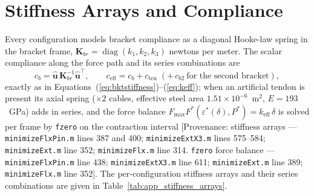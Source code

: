 \section{Stiffness Arrays and Compliance}

Every configuration models bracket compliance as a diagonal Hooke-law spring in the bracket frame, $\mathbf{K}_{br} = \operatorname{diag}(k_{1}, k_{2}, k_{3})$ newtons per meter. The scalar compliance along the force path and its series combinations are
\begin{equation}
    c_{b} = \hat{\mathbf{u}}\,\mathbf{K}_{br}^{-1}\hat{\mathbf{u}}^{\top},
    \qquad
    c_{\text{eff}} = c_{b} + c_{\text{ten}} \;(+\,c_{b2}\ \text{for the second bracket}),
    \label{eq:app_compliance}
\end{equation}
exactly as in Equations~(\ref{eq:bktstiffness})--(\ref{eq:keff}); when an artificial tendon is present its axial spring ($\times2$ cables, effective steel area $1.51\times10^{-6}$~m$^{2}$, $E = 193$~GPa) adds in series, and the force balance $F_{\max}F^{*}(\varepsilon^{*}(\delta), P^{*}) = k_{\text{eff}}\,\delta$ is solved per frame by \texttt{fzero} on the contraction interval [Provenance: stiffness arrays --- \texttt{minimizeFlxPin.m} lines 387 and 400; \texttt{minimizeExtX3.m} lines 575--584; \texttt{minimizeExt.m} line 352; \texttt{minimizeFlx.m} line 314. \texttt{fzero} force balance --- \texttt{minimizeFlxPin.m} line 438; \texttt{minimizeExtX3.m} line 611; \texttt{minimizeExt.m} line 389; \texttt{minimizeFlx.m} line 352]. The per-configuration stiffness arrays and their series combinations are given in Table~\ref{tab:app_stiffness_arrays}.

